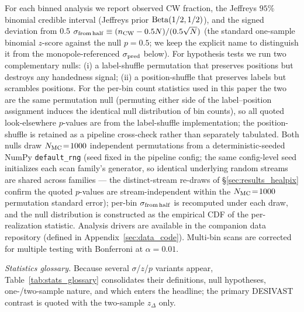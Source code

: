 \documentclass[aps,prd,twocolumn,superscriptaddress,showpacs,preprintnumbers,nofootinbib,longbibliography,floatfix]{revtex4-2}
\begin{document}
For each binned analysis we report observed CW fraction, the Jeffreys
$95\%$ binomial credible interval (Jeffreys prior
${\rm Beta}(1/2,1/2)$), and the signed deviation from $0.5$
$\sigma_{\rm from\,half} \equiv (n_{\rm CW} - 0.5 N)/(0.5\sqrt{N})$
(the standard one-sample binomial $z$-score against the null
$p = 0.5$; we keep the explicit name to distinguish it from the
monopole-referenced $\sigma_{\rm pred}$ below).
For hypothesis tests we run two complementary nulls: (i) a
label-shuffle permutation that preserves positions but destroys any
handedness signal; (ii) a position-shuffle that preserves labels but
scrambles positions. For the per-bin count statistics used in this
paper the two are the same permutation null (permuting either side of
the label--position assignment induces the identical null
distribution of bin counts), so all quoted look-elsewhere $p$-values
are from the label-shuffle implementation; the position-shuffle is
retained as a pipeline cross-check rather than separately tabulated. Both nulls draw $N_{\rm MC}\!=\!1000$
independent permutations from a deterministic-seeded NumPy
\texttt{default\_rng} (seed fixed in the pipeline config; the same
config-level seed initializes each scan family's generator, so
identical underlying random streams are shared across families ---
the distinct-stream re-draws of \S\ref{sec:results_healpix} confirm
the quoted $p$-values are stream-independent within the
$N_{\rm MC}\!=\!1000$ permutation standard error); per-bin
$\sigma_{\rm from\,half}$ is recomputed under each draw, and the
null distribution is constructed as the empirical CDF of the
per-realization statistic. Analysis drivers are available in the
companion data repository (defined in
Appendix~\ref{sec:data_code}). Multi-bin scans are
corrected for multiple testing with Bonferroni at $\alpha\!=\!0.01$.

\emph{Statistics glossary.} Because several $\sigma$/$z$/$p$ variants
appear, Table~\ref{tab:stats_glossary} consolidates their definitions,
null hypotheses, one-/two-sample nature, and which enters the headline;
the primary DESIVAST contrast is quoted with the two-sample $z_\Delta$
only.
\end{document}
